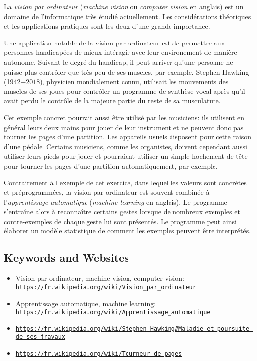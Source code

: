 \documentclass[a4paper,11pt]{report}
\newcommand{\BrochureUrlText}[1]{\texttt{#1}}
\begin{document}
La \emph{vision par ordinateur} (\emph{machine vision} ou \emph{computer vision} en anglais) est un domaine de l’informatique très étudié actuellement. Les considérations théoriques et les applications pratiques sont les deux d’une grande importance.

Une application notable de la vision par ordinateur est de permettre aux personnes handicapées de mieux intéragir avec leur environement de manière autonome. Suivant le degré du handicap, il peut arriver qu’une personne ne puisse plus contrôler que très peu de ses muscles, par exemple. Stephen Hawking (1942$-2018$), physicien mondialement connu, utilisait les mouvements des muscles de ses joues pour contrôler un programme de synthèse vocal après qu’il avait perdu le contrôle de la majeure partie du reste de sa musculature.

Cet exemple concret pourrait aussi être utilisé par les musiciens: ils utilisent en général leurs deux mains pour jouer de leur instrument et ne peuvent donc pas tourner les pages d’une partition. Les appareils usuels disposent pour cette raison d’une pédale. Certains musiciens, comme les organistes, doivent cependant aussi utiliser leurs pieds pour jouer et pourraient utiliser un simple hochement de tête pour tourner les pages d’une partition automatiquement, par exemple.

Contrairement à l’exemple de cet exercice, dans lequel les valeurs sont concrètes et préprogrammées, la vision par ordinateur est souvent combinée à l’\emph{apprentissage automatique} (\emph{machine learning} en anglais). Le programme s’entraîne alors à reconnaître certains gestes lorsque de nombreux exemples et contre-exemples de chaque geste lui sont présentés. Le programme peut ainsi élaborer un modèle statistique de comment les exemples peuvent être interprétés.

{\raggedright

\subsection*{Keywords and Websites}

\begin{itemize}
  \item Vision par ordinateur, machine vision, computer vision: \href{https://fr.wikipedia.org/wiki/Vision_par_ordinateur}{\BrochureUrlText{https://fr.wikipedia.org/wiki/Vision\_par\_ordinateur}}
  \item Apprentissage automatique, machine learning: \href{https://fr.wikipedia.org/wiki/Apprentissage_automatique}{\BrochureUrlText{https://fr.wikipedia.org/wiki/Apprentissage\_automatique}}
  \item \href{https://fr.wikipedia.org/wiki/Stephen_Hawking\#Maladie_et_poursuite_de_ses_travaux}{\BrochureUrlText{https://fr.wikipedia.org/wiki/Stephen\_Hawking\#Maladie\_et\_poursuite\_de\_ses\_travaux}}
  \item \href{https://fr.wikipedia.org/wiki/Tourneur_de_pages}{\BrochureUrlText{https://fr.wikipedia.org/wiki/Tourneur\_de\_pages}}
\end{itemize}


}
\end{document}
